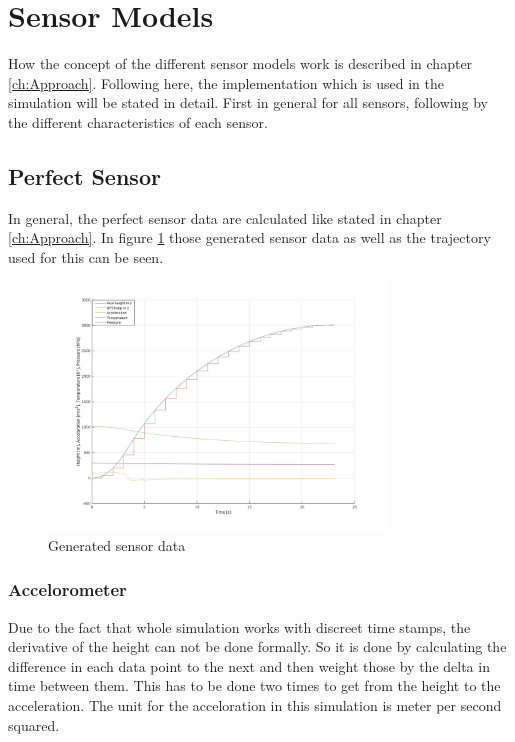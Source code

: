 

\section{Sensor Models}
How the concept of the different sensor models work is described in chapter \ref{ch:Approach}.
Following here, the implementation which is used in the simulation will be stated in detail.
First in general for all sensors, following by the different characteristics of each sensor.

\subsection{Perfect Sensor}
In general, the perfect sensor data are calculated like stated in chapter \ref{ch:Approach}.
In figure \ref{fig:GeneratedPerfectSensor} those generated sensor data as well as the trajectory used for this can be seen.

\begin{figure}[h!]
 \centering
 \includegraphics[width=0.8\textwidth]{./Pictures/GeneratedSensorData.jpg}
 \caption{Generated sensor data}
 \label{fig:GeneratedPerfectSensor}
\end{figure}

\subsubsection{Accelorometer}
Due to the fact that whole simulation works with discreet time stamps, the derivative of the height can not be done formally.
So it is done by calculating the difference in each data point to the next and then weight those by the delta in time between them.
This has to be done two times to get from the height to the acceleration.
The unit for the acceloration in this simulation is meter per second squared.

